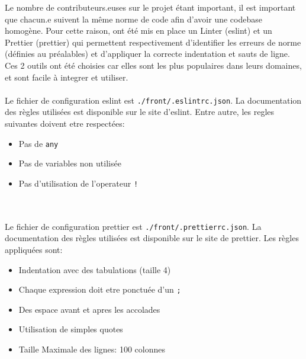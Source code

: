 Le nombre de contributeurs.euses sur le projet étant important, il est important que chacun.e suivent la même norme de code afin d’avoir une codebase homogène.
Pour cette raison, ont été mis en place un Linter (eslint) et un Prettier (prettier) qui permettent respectivement d'identifier les erreurs de norme (définies au préalables) et d’appliquer la correcte indentation et sauts de ligne.
Ces 2 outils ont été choisies car elles sont les plus populaires dans leurs domaines, et sont facile à integrer et utiliser.
\\\\
Le fichier de configuration eslint est \verb|./front/.eslintrc.json|. La documentation des règles utilisées est disponible sur le site d’eslint.
Entre autre, les regles suivantes doivent etre respectées:
\begin{itemize}
	\item Pas de \verb|any|
	\item Pas de variables non utilisée
	\item Pas d'utilisation de l'operateur \verb|!|
\end{itemize}
\\\\
Le fichier de configuration prettier est \verb|./front/.prettierrc.json|. La documentation des règles utilisées est disponible sur le site de prettier.
Les règles appliquées sont:
\begin{itemize}
	\item Indentation avec des tabulations (taille 4)
	\item Chaque expression doit etre ponctuée d'un \verb|;|
	\item Des espace avant et apres les accolades
	\item Utilisation de simples quotes
	\item Taille Maximale des lignes: 100 colonnes
\end{itemize}